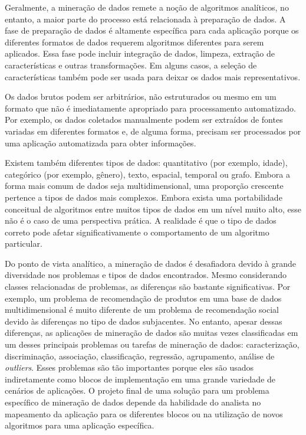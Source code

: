 Geralmente, a mineração de dados remete a noção de algoritmos analíticos, no entanto, a maior parte do processo está relacionada à preparação de dados. A fase de preparação de dados é altamente específica para cada aplicação porque os diferentes formatos de dados requerem algoritmos diferentes para serem aplicados. Essa fase pode incluir integração de dados, limpeza, extração de características e outras transformações. Em alguns casos, a seleção de características também pode ser usada para deixar os dados mais representativos.

Os dados brutos podem ser arbitrários, não estruturados ou mesmo em um formato que não é imediatamente apropriado para processamento automatizado. Por exemplo, os dados coletados manualmente podem ser extraídos de fontes variadas em diferentes formatos e, de alguma forma, precisam ser processados por uma aplicação automatizada para obter informações.

Existem também diferentes tipos de dados: quantitativo (por exemplo, idade), categórico (por exemplo, gênero), texto, espacial, temporal ou grafo. Embora a forma mais comum de dados seja multidimensional, uma proporção crescente pertence a tipos de dados mais complexos. Embora exista uma portabilidade conceitual de algoritmos entre muitos tipos de dados em um nível muito alto, esse não é o caso de uma perspectiva prática. A realidade é que o tipo de dados correto pode afetar significativamente o comportamento de um algoritmo particular.

Do ponto de vista analítico, a mineração de dados é desafiadora devido à grande diversidade nos problemas e tipos de dados encontrados. Mesmo considerando classes relacionadas de problemas, as diferenças são bastante significativas. Por exemplo, um problema de recomendação de produtos em uma base de dados multidimensional é muito diferente de um problema de recomendação social devido às diferenças no tipo de dados subjacentes. No entanto, apesar dessas diferenças, as aplicações de mineração de dados são muitas vezes classificadas em um desses principais problemas ou tarefas de mineração de dados: caracterização, discriminação, associação, classificação, regressão, agrupamento, análise de \textit{outliers}. Esses problemas são tão importantes porque eles são usados indiretamente como blocos de implementação em uma grande variedade de cenários de aplicações. O projeto final de uma solução para um problema específico de mineração de dados depende da habilidade do analista no mapeamento da aplicação para os diferentes blocos ou na utilização de novos algoritmos para uma aplicação específica.

